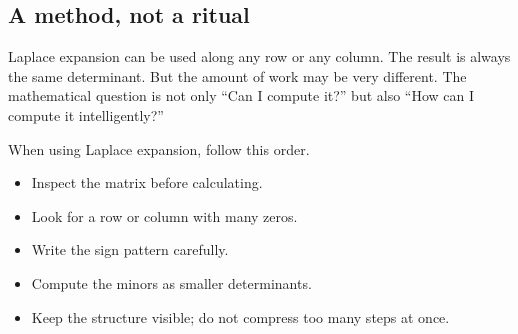 \subsection{A method, not a ritual}

Laplace expansion can be used along any row or any column. The result is always the same determinant. But the amount of work may be very different. The mathematical question is not only ``Can I compute it?'' but also ``How can I compute it intelligently?''

\begin{summarybox}
When using Laplace expansion, follow this order.
\begin{itemize}
\item Inspect the matrix before calculating.
\item Look for a row or column with many zeros.
\item Write the sign pattern carefully.
\item Compute the minors as smaller determinants.
\item Keep the structure visible; do not compress too many steps at once.
\end{itemize}
\end{summarybox}
